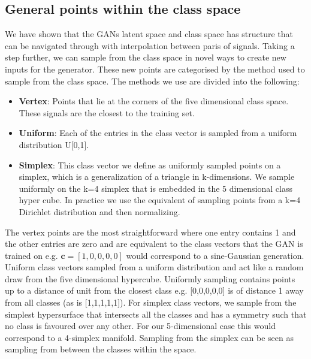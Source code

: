 \documentclass[12pt]{iopart}
\begin{document}
\subsection{General points within the class space}
We have shown that the \acp{GAN} latent space and class space has structure that can be navigated through with interpolation between paris of signals. Taking a step further, we can sample from the class space in novel ways to create new inputs for the generator. These new points are categorised by the method used to sample from the class space. The methods we use are divided into the following: 
%
\begin{itemize}
%
\item {\bf Vertex}: Points that lie at the corners of the five dimensional class space.
These signals are the closest to the training set.
%
\item {\bf Uniform}: Each of the entries in the class vector is sampled from a uniform distribution U[0,1].

%
\item {\bf Simplex}: This class vector we define as uniformly sampled points on a simplex, which is a generalization of a triangle in k-dimensions. We sample uniformly on the k=4 simplex that is embedded in the 5 dimensional class hyper cube. In practice we use the equivalent of sampling points from a k=4 Dirichlet distribution and then normalizing.
%
\end{itemize}

The vertex points are the most straightforward where one entry contains 1 and the other entries are zero and are equivalent to the class vectors that the GAN is trained on e.g. $\mathbf{c} = [1,0,0,0,0]$ would correspond to a sine-Gaussian generation. Uniform class vectors sampled from a uniform distribution and act like a random draw from the five dimensional hypercube. Uniformly sampling contains points up to a distance of unit from the closest class e.g. [0,0,0,0,0] is of distance 1 away from all classes (as is [1,1,1,1,1]). For simplex class vectors, we sample from the simplest hypersurface that intersects all the classes and has a symmetry such that no class is favoured over any other. For our 5-dimensional case this would correspond to a 4-simplex manifold. Sampling from the simplex can be seen as sampling from between the classes within the space.  
\end{document}
